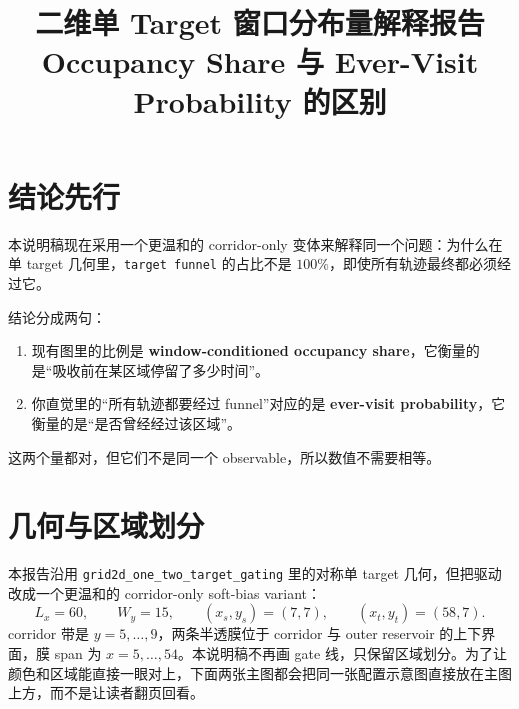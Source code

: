 \documentclass[11pt,fontset=fandol]{ctexart}
\title{二维单 Target 窗口分布量解释报告\\\large Occupancy Share 与 Ever-Visit Probability 的区别}
\author{}
\date{}
\begin{document}
\maketitle

\section*{结论先行}
本说明稿现在采用一个更温和的 corridor-only 变体来解释同一个问题：为什么在单 target 几何里，\texttt{target funnel} 的占比不是 $100\%$，即使所有轨迹最终都必须经过它。

结论分成两句：
\begin{enumerate}
  \item 现有图里的比例是 \textbf{window-conditioned occupancy share}，它衡量的是“吸收前在某区域停留了多少时间”。
  \item 你直觉里的“所有轨迹都要经过 funnel”对应的是 \textbf{ever-visit probability}，它衡量的是“是否曾经经过该区域”。
\end{enumerate}
这两个量都对，但它们不是同一个 observable，所以数值不需要相等。

\section{几何与区域划分}
本报告沿用 \texttt{grid2d\_one\_two\_target\_gating} 里的对称单 target 几何，但把驱动改成一个更温和的 corridor-only soft-bias variant：
\[
L_x=60,\qquad W_y=15,\qquad (x_s,y_s)=(7,7),\qquad (x_t,y_t)=(58,7).
\]
corridor 带是 $y=5,\dots,9$，两条半透膜位于 corridor 与 outer reservoir 的上下界面，膜 span 为 $x=5,\dots,54$。本说明稿不再画 gate 线，只保留区域划分。为了让颜色和区域能直接一眼对上，下面两张主图都会把同一张配置示意图直接放在主图上方，而不是让读者翻页回看。
\end{document}

